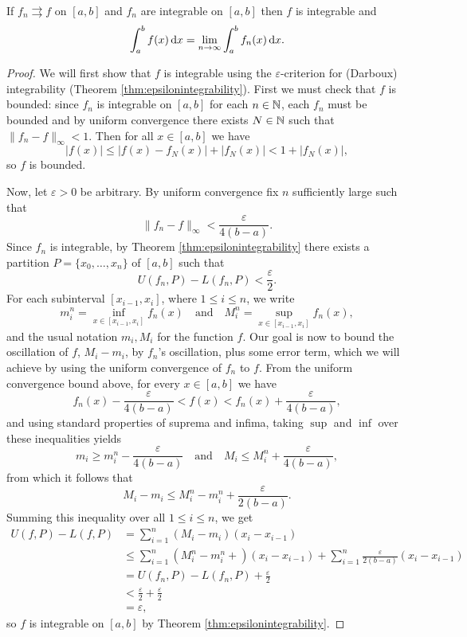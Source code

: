 \documentclass[../analysis1.tex]{subfiles}
\begin{document}
\begin{theorem}
\label{thm:unifintegral}
    \begin{shaded*}
        If $f_n\rightrightarrows f$ on $[a,b]$ and $f_n$ are integrable on $[a,b]$ then $f$ is integrable and
        \[\int_a^b f(x)\d{x}=\lim_{n\to\infty}\int _a^b f_n(x)\d{x}.\]
    \end{shaded*}
\end{theorem}
\begin{proof}
    We will first show that $f$ is integrable using the $\varepsilon$-criterion for (Darboux) integrability (Theorem \ref{thm:epsilonintegrability}). First we must check that $f$ is bounded: since $f_n$ is integrable on $[a,b]$ for each $n\in\mathbb{N}$, each $f_n$ must be bounded and by uniform convergence there exists $N\in\mathbb{N}$ such that $\|f_n-f\|_\infty <1.$ Then for all $x\in[a,b]$ we have \[|f(x)|\le |f(x)-f_N(x)|+|f_N(x)|<1+|f_N(x)|,\]
    so $f$ is bounded. 
    
    Now, let $\varepsilon>0$ be arbitrary. By uniform convergence fix $n$ sufficiently large such that \[\|f_n-f\|_\infty <\frac{\varepsilon}{4(b-a)}.\]
    Since $f_n$ is integrable, by Theorem \ref{thm:epsilonintegrability} there exists a partition $P=\{x_0,\dots,x_n\}$ of $[a,b]$ such that \[U(f_n,P)-L(f_n,P)<\frac{\varepsilon}{2}.\]
    For each subinterval $[x_{i - 1},x_i]$, where $1\le i\le n$, we write 
    \[m^n_i=\inf_{x\in [x_{i - 1},x_i]}f_n(x)\quad\text{and}\quad M^n_i=\sup_{x\in[x_{i - 1},x_i]}f_n(x),\]
    and the usual notation $m_i,M_i$ for the function $f$. Our goal is now to bound the oscillation of $f$, $M_i-m_i$, by $f_n$'s oscillation, plus some error term, which we will achieve by using the uniform convergence of $f_n$ to $f$. From the uniform convergence bound above, for every $x\in[a,b]$ we have \[f_n(x)-\frac{\varepsilon}{4(b-a)}<f(x)<f_n(x)+\frac{\varepsilon}{4(b-a)},\]
    and using standard properties of suprema and infima, taking $\sup$ and $\inf$ over these inequalities yields \[m_i\ge m_i^n-\frac{\varepsilon}{4(b-a)}\quad\text{and}\quad M_i\le M_i^n+\frac{\varepsilon}{4(b-a)},\]
    from which it follows that \[M_i-m_i\le M^n_i-m^n_i+\frac{\varepsilon}{2(b-a)}.\]
    Summing this inequality over all $1\le i\le n$, we get
    \begin{align*}
        U(f,P)-L(f,P)&=\sum_{i=1}^n(M_i-m_i)(x_i-x_{i - 1})\\
        &\le \sum_{i=1}^n(M^n_i-m^n_i+)(x_i-x_{i - 1})+\sum_{i=1}^n\frac{\varepsilon}{2(b-a)}(x_i-x_{i - 1})\\
        &= U(f_n,P)-L(f_n,P)+\frac{\varepsilon}{2}\\
        &<\frac{\varepsilon}{2}+\frac{\varepsilon}{2}\\
        &=\varepsilon,
    \end{align*}
    so $f$ is integrable on $[a,b]$ by Theorem \ref{thm:epsilonintegrability}.


\end{proof}
\end{document}
